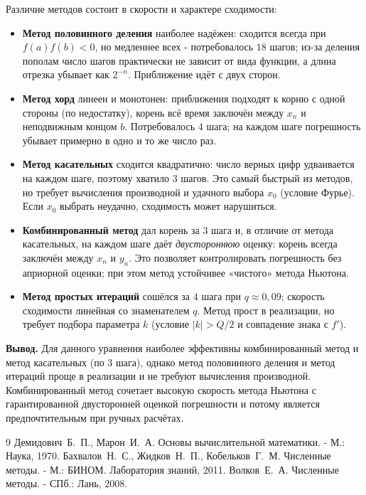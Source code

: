 \documentclass[14pt,a4paper]{extarticle}
\begin{document}
Различие методов состоит в скорости и характере сходимости:
\begin{itemize}
    \item \textbf{Метод половинного деления} наиболее надёжен: сходится
          всегда при $f(a)f(b)<0$, но медленнее всех - потребовалось
          $18$ шагов; из-за деления пополам число шагов практически не
          зависит от вида функции, а длина отрезка убывает как
          $2^{-n}$. Приближение идёт с двух сторон.

    \item \textbf{Метод хорд} линеен и монотонен: приближения подходят к
          корню с одной стороны (по недостатку), корень всё время
          заключён между $x_n$ и неподвижным концом $b$. Потребовалось
          $4$ шага; на каждом шаге погрешность убывает примерно в одно
          и то же число раз.

    \item \textbf{Метод касательных} сходится квадратично: число верных
          цифр удваивается на каждом шаге, поэтому хватило $3$ шагов.
          Это самый быстрый из методов, но требует вычисления
          производной и удачного выбора $x_0$ (условие Фурье). Если
          $x_0$ выбрать неудачно, сходимость может нарушиться.

    \item \textbf{Комбинированный метод} дал корень за $3$ шага и, в
          отличие от метода касательных, на каждом шаге даёт
          \emph{двустороннюю} оценку: корень всегда заключён между
          $x_n$ и $y_n$. Это позволяет контролировать погрешность без
          априорной оценки; при этом метод устойчивее «чистого» метода
          Ньютона.

    \item \textbf{Метод простых итераций} сошёлся за $4$ шага при
          $q\approx0{,}09$; скорость сходимости линейная со знаменателем
          $q$. Метод прост в реализации, но требует подбора параметра
          $k$ (условие $|k|>Q/2$ и совпадение знака с $f'$).
\end{itemize}

\textbf{Вывод.} Для данного уравнения наиболее эффективны
комбинированный метод и метод касательных (по $3$ шага), однако метод
половинного деления и метод итераций проще в реализации и не требуют
вычисления производной. Комбинированный метод сочетает высокую
скорость метода Ньютона с гарантированной двусторонней оценкой
погрешности и потому является предпочтительным при ручных расчётах.

\begin{thebibliography}{9}
     Демидович~Б.~П., Марон~И.~А.
        Основы вычислительной математики. - М.: Наука, 1970.
     Бахвалов~Н.~С., Жидков~Н.~П., Кобельков~Г.~М.
        Численные методы. - М.: БИНОМ. Лаборатория знаний, 2011.
     Волков~Е.~А. Численные методы. - СПб.: Лань, 2008.
\end{thebibliography}
\end{document}
